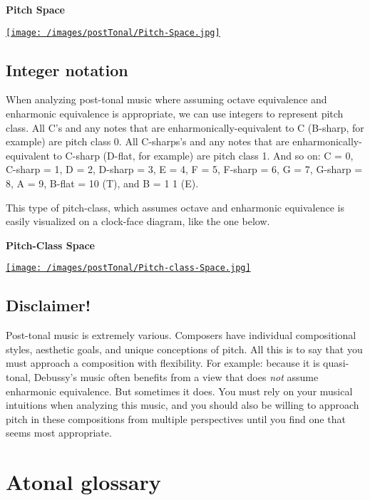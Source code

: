 \documentclass{book}
\begin{document}
\textbf{Pitch Space}

\href{/images/postTonal/Pitch-Space.jpg}{\texttt{[image: /images/postTonal/Pitch-Space.jpg]}}

\hypertarget{integer-notation}{%
\subsection{Integer notation}\label{integer-notation}}

When analyzing post-tonal music where assuming octave equivalence and
enharmonic equivalence is appropriate, we can use integers to represent pitch
class. All C's and any notes that are enharmonically-equivalent to C (B-sharp,
for example) are pitch class 0. All C-sharps's and any notes that are
enharmonically-equivalent to C-sharp (D-flat, for example) are pitch class 1.
And so on: C = 0, C-sharp = 1, D = 2, D-sharp = 3, E = 4, F = 5, F-sharp = 6,
G = 7, G-sharp = 8, A = 9, B-flat = 10 (T), and B = 1 1 (E).

This type of pitch-class, which assumes octave and enharmonic equivalence is
easily visualized on a clock-face diagram, like the one below.

\textbf{Pitch-Class Space}

\href{/images/postTonal/Pitch-class-Space.jpg}{\texttt{[image: /images/postTonal/Pitch-class-Space.jpg]}}

\hypertarget{disclaimer}{%
\subsection{Disclaimer!}\label{disclaimer}}

Post-tonal music is extremely various. Composers have individual compositional
styles, aesthetic goals, and unique conceptions of pitch. All this is to say
that you must approach a composition with flexibility. For example: because it
is quasi-tonal, Debussy's music often benefits from a view that does
\emph{not} assume enharmonic equivalence. But sometimes it does. You must rely
on your musical intuitions when analyzing this music, and you should also be
willing to approach pitch in these compositions from multiple perspectives
until you find one that seems most appropriate.

\hypertarget{atonal-glossary}{%
\section{Atonal glossary}\label{atonal-glossary}}
\end{document}
